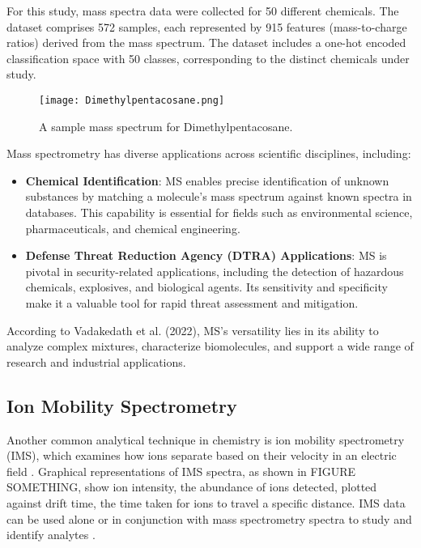 \documentclass[sigconf]{acmart}
\begin{document}
For this study, mass spectra data were collected for 50 different chemicals. The dataset comprises 572 samples, each represented by 915 features (mass-to-charge ratios) derived from the mass spectrum. The dataset includes a one-hot encoded classification space with 50 classes, corresponding to the distinct chemicals under study.

\begin{figure}[h]
    \centering
    \texttt{[image: Dimethylpentacosane.png]}
    \caption{A sample mass spectrum for Dimethylpentacosane.}
    \label{fig:enter-label}
\end{figure}

Mass spectrometry has diverse applications across scientific disciplines, including:

\begin{itemize}
    \item \textbf{Chemical Identification}: MS enables precise identification of unknown substances by matching a molecule's mass spectrum against known spectra in databases. This capability is essential for fields such as environmental science, pharmaceuticals, and chemical engineering.\\
    \item \textbf{Defense Threat Reduction Agency (DTRA) Applications}: MS is pivotal in security-related applications, including the detection of hazardous chemicals, explosives, and biological agents. Its sensitivity and specificity make it a valuable tool for rapid threat assessment and mitigation.
\end{itemize}

According to Vadakedath et al. (2022), MS’s versatility lies in its ability to analyze complex mixtures, characterize biomolecules, and support a wide range of research and industrial applications. \cite{Vadakedath2022MS}

\subsection{Ion Mobility Spectrometry}
Another common analytical technique in chemistry is ion mobility spectrometry (IMS), which examines how ions separate based on their velocity in an electric field \cite{hill1990ion}. Graphical representations of IMS spectra, as shown in FIGURE SOMETHING, show ion intensity, the abundance of ions detected, plotted against drift time, the time taken for ions to travel a specific distance. IMS data can be used alone or in conjunction with mass spectrometry spectra to study and identify analytes \cite{dodds2019ion}. 
\end{document}

